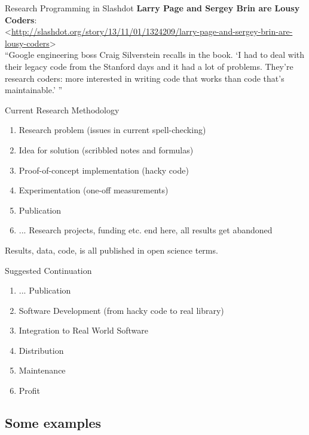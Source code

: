\documentclass[t,12pt]{beamer}
\begin{document}
\begin{frame}{Research Programming in Slashdot}
    \textbf{Larry Page and Sergey Brin are Lousy Coders}:\\
    <\url{http://slashdot.org/story/13/11/01/1324209/larry-page-and-sergey-brin-are-lousy-coders}>\\
    ``Google engineering boss Craig Silverstein recalls in the book. `I had to
    deal with their legacy code from the Stanford days and it had a lot of
    problems. They're research coders: more interested in writing code that
    works than code that's maintainable.' ''
\end{frame}

\begin{frame}{Current Research Methodology}
    \begin{enumerate}
        \item Research problem (issues in current spell-checking)
        \item Idea for solution (scribbled notes and formulas)
        \item Proof-of-concept implementation (hacky code)
        \item Experimentation (one-off measurements)
        \item Publication
        \item ... Research projects, funding etc. end here, all results get abandoned
    \end{enumerate}
    Results, data, code, is all published in open science terms.
\end{frame}

\begin{frame}{Suggested Continuation}
    \begin{enumerate}
        \item ... Publication 
        \item Software Development (from hacky code to real library)
        \item Integration to Real World Software
        \item Distribution
        \item Maintenance
        \item Profit
    \end{enumerate}
\end{frame}

\subsection{Some examples}
\end{document}
